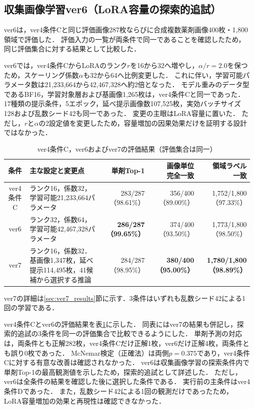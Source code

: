 \documentclass[uplatex,dvipdfmx]{jsarticle}
\begin{document}
\subsection{収集画像学習ver6（LoRA容量の探索的追試）}\label{sec:ver6_training}

ver6は，ver4条件Cと同じ評価画像287枚ならびに合成複数薬剤画像400枚・1,800領域で評価した．
評価入力の一覧が両条件で同一であることを確認したため，同じ評価集合に対する結果として比較した．

ver6では，ver4条件CからLoRAのランク$r$を16から32へ増やし，$\alpha/r=2.0$を保つため，スケーリング係数$\alpha$も32から64へ比例変更した．
これに伴い，学習可能パラメータ数は21,233,664から42,467,328へ約2倍となった．
モデル重みのデータ型であるBF16，学習対象層および基画像1,265枚は，ver4条件Cと同一であった．
17種類の提示条件，5エポック，延べ提示画像数107,525枚，実効バッチサイズ128および乱数シード42も同一であった．
変更の主眼はLoRA容量に置いた．
ただし，$r$と$\alpha$の2設定値を変更したため，容量増加の因果効果だけを証明する設計ではなかった．

\begin{table}[htbp]
  \centering
  \caption{ver4条件C，ver6およびver7の評価結果（評価集合は同一）}
  \label{tab:condition_c_ver6}
  \scriptsize
  \setlength{\tabcolsep}{3pt}
  \begin{tabular}{|c|p{4.4cm}|r|r|r|}
    \hline
    条件 & 主な設定と変更点 & 単剤\mbox{Top-1} & \shortstack{画像単位\\完全一致} & \shortstack{領域ラベル\\一致} \\ \hline
    ver4条件C & ランク16，係数32，学習可能21,233,664パラメータ & 283/287（98.61\%） & 356/400（89.00\%） & 1,752/1,800（97.33\%） \\ \hline
    ver6 & ランク32，係数64，学習可能42,467,328パラメータ & \textbf{286/287（99.65\%）} & 374/400（93.50\%） & 1,773/1,800（98.50\%） \\ \hline
    ver7 & ランク16，係数32．基画像1,347枚，延べ提示114,495枚，41候補から選択する推論 & 284/287（98.95\%） & \textbf{380/400（95.00\%）} & \textbf{1,780/1,800（98.89\%）} \\ \hline
  \end{tabular}

  \vspace{1mm}
  {\scriptsize ver7の詳細は\ref{sec:ver7_results}節に示す．3条件はいずれも乱数シード42による1回の学習である．}
\end{table}

ver4条件Cとver6の評価結果を表\ref{tab:condition_c_ver6}に示した．
同表にはver7の結果も併記し，探索的追試の3条件を同一の評価集合で比較できるようにした．
単剤予測の対応は，両条件とも正解282枚，ver4条件Cだけ正解1枚，ver6だけ正解4枚，両条件とも誤り0枚であった．
McNemar検定（正確法）は両側$p=0.375$であり，ver4条件Cに対する有意な改善は確認されなかった．
ver6は収集画像学習の探索条件内で単剤Top-1の最高観測値を示したため，探索的追試として詳述した．
ただし，ver6は全条件の結果を確認した後に選択した条件である．
実行前の主条件はver4条件Dであった．
また，乱数シード42による1回の観測だけであったため，LoRA容量増加の効果と再現性は確認できなかった．
\end{document}
